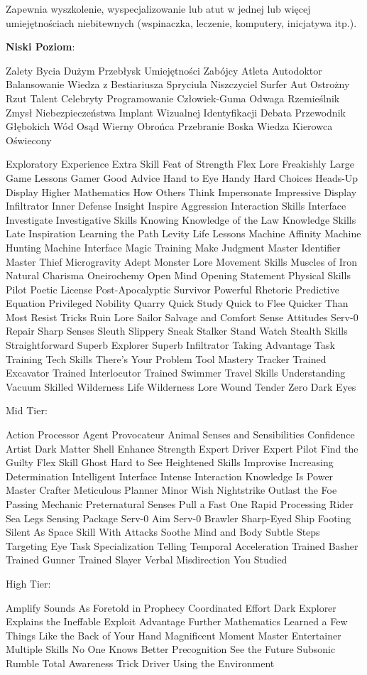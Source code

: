 Zapewnia wyszkolenie, wyspecjalizowanie lub atut w jednej lub więcej umiejętnościach niebitewnych (wspinaczka, leczenie, komputery, inicjatywa itp.).

\textbf{Niski Poziom}:

Zalety Bycia Dużym
Przebłysk
Umiejętności Zabójcy
Atleta
Autodoktor
Balansowanie
Wiedza z Bestiariusza
Spryciula
Niszczyciel
Surfer Aut
Ostrożny Rzut
Talent Celebryty
Programowanie
Człowiek-Guma
Odwaga
Rzemieślnik
Zmysł Niebezpieczeństwa 
Implant Wizualnej Identyfikacji
Debata
Przewodnik Głębokich Wód
Osąd
Wierny Obrońca
Przebranie
Boska Wiedza 
Kierowca
Oświecony

Exploratory Experience
Extra Skill
Feat of Strength
Flex Lore
Freakishly Large
Game Lessons
Gamer
Good Advice
Hand to Eye
Handy
Hard Choices
Heads-Up Display
Higher Mathematics
How Others Think
Impersonate
Impressive Display
Infiltrator
Inner Defense
Insight
Inspire Aggression
Interaction Skills
Interface
Investigate
Investigative Skills
Knowing
Knowledge of the Law
Knowledge Skills
Late Inspiration
Learning the Path
Levity
Life Lessons
Machine Affinity
Machine Hunting
Machine Interface
Magic Training
Make Judgment
Master Identifier
Master Thief
Microgravity Adept
Monster Lore
Movement Skills
Muscles of Iron
Natural Charisma
Oneirochemy
Open Mind
Opening Statement
Physical Skills
Pilot
Poetic License
Post-Apocalyptic Survivor
Powerful Rhetoric
Predictive Equation
Privileged Nobility
Quarry
Quick Study
Quick to Flee
Quicker Than Most
Resist Tricks
Ruin Lore
Sailor
Salvage and Comfort
Sense Attitudes
Serv-0 Repair
Sharp Senses
Sleuth
Slippery
Sneak
Stalker
Stand Watch
Stealth Skills
Straightforward
Superb Explorer
Superb Infiltrator
Taking Advantage
Task Training
Tech Skills
There’s Your Problem
Tool Mastery
Tracker
Trained Excavator
Trained Interlocutor
Trained Swimmer
Travel Skills
Understanding
Vacuum Skilled
Wilderness Life
Wilderness Lore
Wound Tender
Zero Dark Eyes

Mid Tier:

Action Processor
Agent Provocateur
Animal Senses and Sensibilities
Confidence Artist
Dark Matter Shell
Enhance Strength
Expert Driver
Expert Pilot
Find the Guilty
Flex Skill
Ghost
Hard to See
Heightened Skills
Improvise
Increasing Determination
Intelligent Interface
Intense Interaction
Knowledge Is Power
Master Crafter
Meticulous Planner
Minor Wish
Nightstrike
Outlast the Foe
Passing Mechanic
Preternatural Senses
Pull a Fast One
Rapid Processing
Rider
Sea Legs
Sensing Package
Serv-0 Aim
Serv-0 Brawler
Sharp-Eyed
Ship Footing
Silent As Space
Skill With Attacks
Soothe Mind and Body
Subtle Steps
Targeting Eye
Task Specialization
Telling
Temporal Acceleration
Trained Basher
Trained Gunner
Trained Slayer
Verbal Misdirection
You Studied

High Tier:

Amplify Sounds
As Foretold in Prophecy
Coordinated Effort
Dark Explorer
Explains the Ineffable
Exploit Advantage
Further Mathematics
Learned a Few Things
Like the Back of Your Hand
Magnificent Moment
Master Entertainer
Multiple Skills
No One Knows Better
Precognition
See the Future
Subsonic Rumble
Total Awareness
Trick Driver
Using the Environment